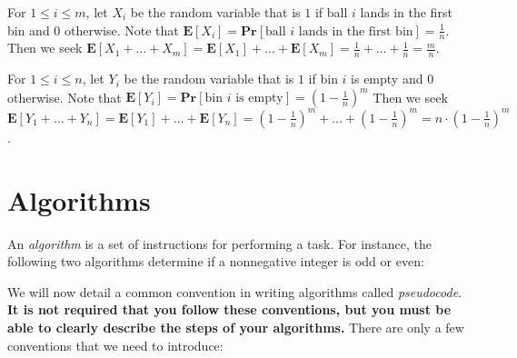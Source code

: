 \documentclass[12pt]{article}
\theoremstyle{plain}
\theoremstyle{definition}
\theoremstyle{remark}
\renewcommand{\Pr}{\textbf{Pr}}
\newcommand{\E}{\textbf{E}}
\begin{document}
\begin{enumerate}
\begin{tcolorbox}
For $1\le i\le m$, let $X_i$ be the random variable that is $1$ if ball $i$ lands in the first bin and $0$ otherwise. Note that $\E[X_i]=\Pr[\text{ball }i\text{ lands in the first bin}]=\frac1n$. Then we seek $\E[X_1+\dots+X_m]=\E[X_1]+\dots+\E[X_m]=\frac1n+\dots+\frac1n=\frac{m}n$.

For $1\le i\le n$, let $Y_i$ be the random variable that is $1$ if bin $i$ is empty and $0$ otherwise. Note that $\E[Y_i]=\Pr[\text{bin }i\text{ is empty}]=\left(1-\frac1n\right)^m$ Then we seek $\E[Y_1+\dots+Y_n]=\E[Y_1]+\dots+\E[Y_n]=\left(1-\frac1n\right)^m+\dots+\left(1-\frac1n\right)^m=n\cdot\left(1-\frac1n\right)^m$.
\end{tcolorbox}
\end{enumerate}

\section{Algorithms}

An \emph{algorithm} is a set of instructions for performing a task. For instance, the following two algorithms determine if a nonnegative integer is odd or even:

\begin{center}
\begin{minipage}[t]{8cm}
\vspace{0pt}
\begin{algorithm}[H]
\DontPrintSemicolon
{}
\end{algorithm}
\end{minipage}
\begin{minipage}[t]{8cm}
\vspace{0pt}
\begin{algorithm}[H]
\DontPrintSemicolon
{}
\end{algorithm}
\end{minipage}
\end{center}

We will now detail a common convention in writing algorithms called \emph{pseudocode}. \noindent \textbf{It is not required that you follow these conventions, but you must be able to clearly describe the steps of your algorithms.} There are only a few conventions that we need to introduce:
\end{document}
